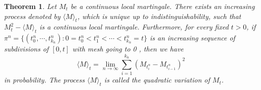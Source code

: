\documentclass[twoside, 12pt]{book}
\numberwithin{equation}{chapter}
\newtheorem{theorem}{Theorem}[section]
\begin{document}
	
	\begin{theorem}\label{Thm:quadratic}
		Let $M_t$ be a continuous local martingale. There exists an increasing process denoted by $\langle M \rangle_t$, which is unique up to indistinguishability, such that $M_t^2-\langle M\rangle_t$ is a continuous local martingale. Furthermore, for every fixed $t>0$, if $\pi^n=\{(t_0^n,\cdots, t_{k_n}^n): 0=t_0^n<t_1^n<\cdots<t_{k_n}^n=t\}$ is an increasing sequence of subdivisions of $[0, t]$ with mesh going to 0 , then we have
		\begin{equation}\label{eq:quadratic}
			\langle  M\rangle_t=\lim _{n \rightarrow \infty} \sum_{i=1}^{k_n}\left(M_{t_i^n}-M_{t_{i-1}^n}\right)^2
		\end{equation}
		in probability. The process $\langle M\rangle_t$ is called the quadratic variation of $M_t $. 
	\end{theorem}
	
\end{document}
